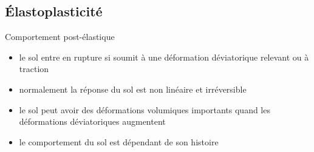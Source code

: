 \subsection{Élastoplasticité}
\label{subsec:elasto-plasticity}
\begin{frame}{Comportement post-élastique}
	\begin{itemize}
		\item le sol entre en rupture si soumit à une déformation déviatorique relevant ou à traction 
		\item normalement la réponse du sol est non linéaire et irréversible 
		\item le sol peut avoir des déformations volumiques importants quand les
		déformations déviatoriques augmentent
		\item le comportement du sol est dépendant de son histoire
	\end{itemize}

\end{frame}

